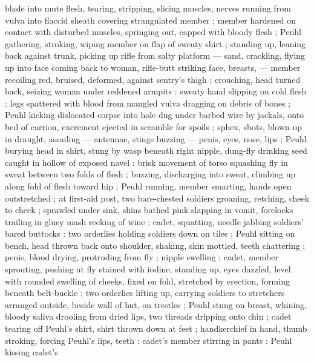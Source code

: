 blade into mute flesh, tearing, %
stripping, slicing muscles, nerves running from vulva into flaccid sheath covering strangulated
member ; member hardened on contact with disturbed muscles, springing out, capped with bloody flesh
; Peuhl gathering, stroking, wiping member on flap of sweaty shirt ; standing up, leaning back
against trunk, picking up rifle from salty platform --- sand, crackling, flying up into face
{\dashcom} coming back to woman, rifle-butt striking face, breasts, --- member recoiling red,
bruised, deformed, against sentry's thigh ; crouching, head turned back, seizing woman under
reddened armpits : sweaty hand slipping on cold flesh ; legs spattered with blood from mangled vulva
dragging on debris of bones ; Peuhl kicking dislocated corpse into hole dug under barbed wire by
jackals, onto bed of carrion, excrement ejected in scramble for spoils ; sphex, sbots, blown up in
draught, assailing --- antennae, stings buzzing --- penis, eyes, nose, lips ; Peuhl burying head in
shirt, stung by wasp beneath right nipple, dung-fly drinking seed caught in hollow of exposed navel
: brisk movement of torso squashing fly in sweat between two folds of flesh ; buzzing, discharging
into sweat, climbing up along fold of flesh toward hip ; Peuhl running, member smarting, hands open
outstretched ; at first-aid post, two bare-chested soldiers groaning, retching, cheek to cheek ;
sprawled under sink, shins bathed pink slapping in vomit, forelocks trailing in gluey mash reeking
of wine ; cadet, squatting, needle jabbing soldiers' bared buttocks : two orderlies holding soldiers
down on tiles ; Peuhl sitting on bench, head thrown back onto shoulder, shaking, skin mottled, teeth
chattering ; penis, blood drying, protruding from fly ; nipple swelling ; cadet, member sprouting,
pushing at fly stained with iodine, standing up, eyes dazzled, level with rounded swelling of
cheeks, fixed on fold, stretched by erection, forming beneath belt-buckle ; two orderlies lifting
up, carrying soldiers to stretchers arranged outside, beside wall of hut, on trestles ; Peuhl stung
on breast, whining, bloody saliva drooling from dried lips, two threads dripping onto chin ; cadet
tearing off Peuhl's shirt, shirt thrown down at feet ; handkerchief in hand, thumb stroking, forcing
Peuhl's lips, teeth : %
cadet's member stirring in pants {\thd}  : Peuhl kissing cadet's
